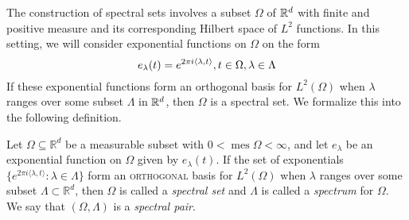 \documentclass[../thesis.tex]{subfiles}
\begin{document}







The construction of spectral sets involves a subset $\Omega$ of $\mathbb{R}^d$ with finite and positive measure and its corresponding Hilbert space of $L^2$ functions. In this setting, we will consider exponential functions on $\Omega$ on the form 
\begin{equation}\label{eq:exp}
    e_{\lambda}(t) = e^{2 \pi i \langle \lambda, t \rangle}, t\in \Omega, \lambda \in \Lambda
\end{equation}
If these exponential functions form an orthogonal basis for $L^2(\Omega)$ when $\lambda$ ranges over some subset $\Lambda$ in $\mathbb{R}^d$, then $\Omega$ is a spectral set. We formalize this into the following definition.

\begin{definition} \label{def:spectral_set}
    Let $\Omega \subseteq \mathbb{R}^d$ be a measurable subset with $0< \operatorname{mes} \Omega < \infty$, and let $e_{\lambda}$ be an exponential function on $\Omega$ given by $e_{\lambda}(t)$. If the set of exponentials $\{ e^{2\pi i \langle \lambda,t  \rangle } : \lambda \in \Lambda\}$  form an \textsc{orthogonal} basis for $L^2 (\Omega)$ when $\lambda$ ranges over some subset $\Lambda \subset \mathbb{R}^d$, then $\Omega$ is called a \emph{spectral set} and $\Lambda$ is called a \emph{spectrum} for $\Omega$. We say that $(\Omega, \Lambda)$ is a \emph{spectral pair}. 
\end{definition}
\end{document}
